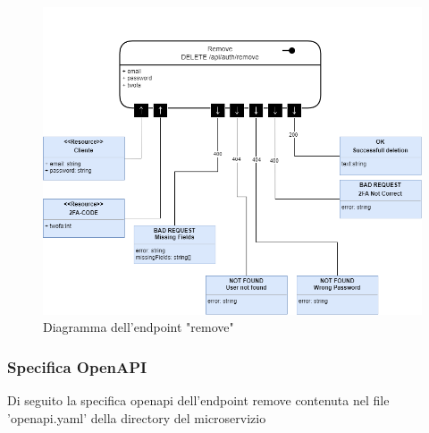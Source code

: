 \documentclass{report}
\begin{document}
\begin{figure}[H]
	\centering\includegraphics[width=1\textwidth]{images/microservizio-autenticazione/diagrams/diagramma_remove.drawio.png}
	\caption{Diagramma dell'endpoint "remove"}
\end{figure}

\subsubsection*{Specifica OpenAPI}
Di seguito la specifica openapi dell'endpoint remove contenuta nel file 'openapi.yaml' della directory del microservizio
\end{document}
